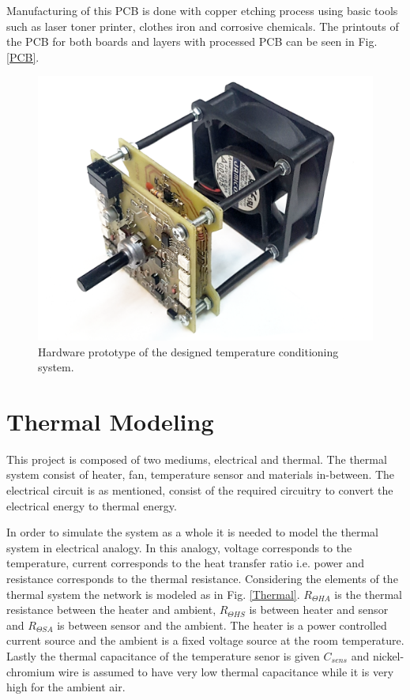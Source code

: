 \documentclass[conference]{IEEEtran}
\begin{document}
Manufacturing of this PCB is done with copper etching process using basic tools such as laser toner printer, clothes iron and corrosive chemicals. The printouts of the PCB for both boards and layers with processed PCB can be seen in Fig.\ref{PCB}.


\begin{figure}
\centerline{\includegraphics[scale=0.14]{figures/circu.png}}
\caption{Hardware prototype of the designed temperature conditioning system.}
\end{figure}


\section{Thermal Modeling}
This project is composed of two mediums, electrical and thermal. The thermal system consist of heater, fan, temperature sensor and materials in-between. The electrical circuit is as mentioned, consist of the required circuitry to convert the electrical energy to thermal energy. 

In order to simulate the system as a whole it is needed to model the thermal system in electrical analogy. In this analogy, voltage corresponds to the temperature, current corresponds to the heat transfer ratio i.e. power and resistance  corresponds to the thermal resistance. Considering the elements of the thermal system the network is modeled as in Fig. \ref{Thermal}. $R_{\Theta HA}$ is the thermal resistance between the heater and ambient, $R_{\Theta HS}$ is between heater and sensor and $R_{\Theta SA}$ is between sensor and the ambient. The heater is a power controlled current source and the ambient is a fixed voltage source at the room temperature. Lastly the thermal capacitance of the temperature senor is given $C_{sens}$ and nickel-chromium wire is assumed to have very low thermal capacitance while it is very high for the ambient air.
\end{document}
